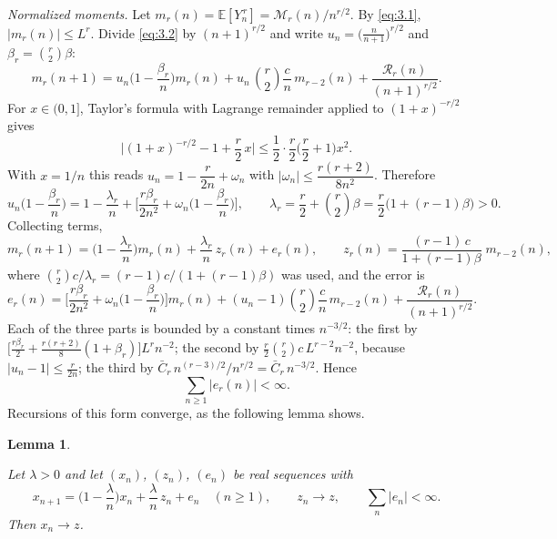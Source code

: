 \documentclass[aip,jmp,preprint,onecolumn,floatfix,superscriptaddress,nofootinbib,11pt]{revtex4-2}
\theoremstyle{plain}
\newtheorem{lemma}{Lemma}
\theoremstyle{remark}
\numberwithin{equation}{section}
\newcommand{\E}{\mathbb{E}}
\begin{document}
 
\textit{Normalized moments.} Let $m_r(n)=\E[Y_n^{\,r}]=\mathcal M_r(n)/n^{r/2}$. By \eqref{eq:3.1}, $|m_r(n)|\le L^{r}$. Divide \eqref{eq:3.2} by $(n+1)^{r/2}$ and write $u_n=\big(\tfrac{n}{n+1}\big)^{r/2}$ and $\beta_r=\binom r2\beta$:
%
\begin{equation*}
m_r(n+1)=u_n\Big(1-\frac{\beta_r}{n}\Big)m_r(n)+u_n\,\binom r2\frac{c}{n}\,m_{r-2}(n)+\frac{\mathcal R_r(n)}{(n+1)^{r/2}} .
\end{equation*}
%
For $x\in(0,1]$, Taylor's formula with Lagrange remainder applied to $(1+x)^{-r/2}$ gives
%
\begin{equation*}
\Big|(1+x)^{-r/2}-1+\frac r2\,x\Big|\le\frac12\cdot\frac r2\Big(\frac r2+1\Big)x^{2}.
\end{equation*}
%
With $x=1/n$ this reads $u_n=1-\dfrac{r}{2n}+\omega_n$ with $|\omega_n|\le\dfrac{r(r+2)}{8n^{2}}$. Therefore
%
\begin{equation*}
u_n\Big(1-\frac{\beta_r}{n}\Big)=1-\frac{\lambda_r}{n}+\Big[\frac{r\beta_r}{2n^{2}}+\omega_n\Big(1-\frac{\beta_r}{n}\Big)\Big],\qquad \lambda_r=\frac r2+\binom r2\beta=\frac r2\big(1+(r-1)\beta\big)>0 .
\end{equation*}
%
Collecting terms,
%
\begin{equation}
m_r(n+1)=\Big(1-\frac{\lambda_r}{n}\Big)m_r(n)+\frac{\lambda_r}{n}\,z_r(n)+e_r(n),\qquad z_r(n)=\frac{(r-1)\,c}{1+(r-1)\beta}\;m_{r-2}(n),
\label{eq:3.3}
\end{equation}
%
where $\binom r2c/\lambda_r=(r-1)c/(1+(r-1)\beta)$ was used, and the error is
%
\begin{equation*}
e_r(n)=\Big[\frac{r\beta_r}{2n^{2}}+\omega_n\Big(1-\frac{\beta_r}{n}\Big)\Big]m_r(n)+(u_n-1)\binom r2\frac cn\,m_{r-2}(n)+\frac{\mathcal R_r(n)}{(n+1)^{r/2}} .
\end{equation*}
%
Each of the three parts is bounded by a constant times $n^{-3/2}$: the first by $\big[\tfrac{r\beta_r}{2}+\tfrac{r(r+2)}{8}(1+\beta_r)\big]L^{r}n^{-2}$; the second by $\tfrac r2\binom r2c\,L^{r-2}n^{-2}$, because $|u_n-1|\le\tfrac{r}{2n}$; the third by $\bar C_r\,n^{(r-3)/2}/n^{r/2}=\bar C_r\,n^{-3/2}$. Hence
%
\begin{equation}
\sum_{n\ge1}|e_r(n)|<\infty .
\label{eq:3.4}
\end{equation}
%
Recursions of this form converge, as the following lemma shows.
 
\begin{lemma}\label{lem:2}
 
Let $\lambda>0$ and let $(x_n)$, $(z_n)$, $(e_n)$ be real sequences with
%
\begin{equation*}
x_{n+1}=\Big(1-\frac\lambda n\Big)x_n+\frac\lambda n\,z_n+e_n\quad(n\ge1),\qquad z_n\to z,\qquad \sum_n|e_n|<\infty .
\end{equation*}
%
Then $x_n\to z$.
 
\end{lemma}
 
\end{document}
